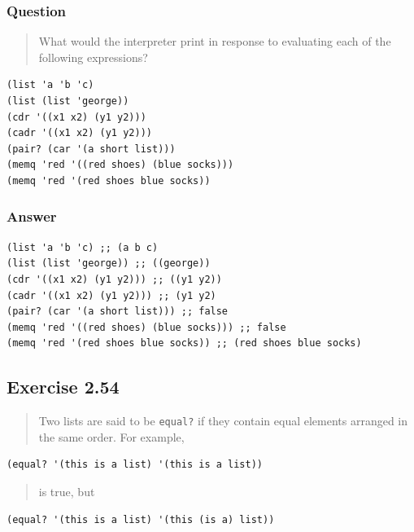 \documentclass[final,fleqn,titlepage,twoside]{article}
\begin{document}
\subsubsection{Question}
\label{sec:org05645d3}
\begin{quote}
What would the interpreter print
in response to evaluating each of the following expressions?
\end{quote}

\begin{verbatim}
(list 'a 'b 'c)
(list (list 'george))
(cdr '((x1 x2) (y1 y2)))
(cadr '((x1 x2) (y1 y2)))
(pair? (car '(a short list)))
(memq 'red '((red shoes) (blue socks)))
(memq 'red '(red shoes blue socks))
\end{verbatim}

\subsubsection{Answer}
\label{sec:orgc2e97ad}
\begin{verbatim}
(list 'a 'b 'c) ;; (a b c)
(list (list 'george)) ;; ((george))
(cdr '((x1 x2) (y1 y2))) ;; ((y1 y2))
(cadr '((x1 x2) (y1 y2))) ;; (y1 y2)
(pair? (car '(a short list))) ;; false
(memq 'red '((red shoes) (blue socks))) ;; false
(memq 'red '(red shoes blue socks)) ;; (red shoes blue socks)
\end{verbatim}

\subsection{Exercise 2.54}
\label{sec:orgc4afccb}
\begin{quote}
Two lists are said to be \texttt{equal?} if they contain equal elements
arranged in the same order. For example,
\end{quote}

\begin{verbatim}
(equal? '(this is a list) '(this is a list))
\end{verbatim}

\begin{quote}
is true, but
\end{quote}

\begin{verbatim}
(equal? '(this is a list) '(this (is a) list))
\end{verbatim}
\end{document}

